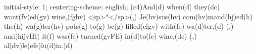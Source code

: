 initial-style: 1;
centering-scheme: english;
(c4)And(d) when(d) they(dc) want(fv)ed(gv) wine,(fghv) <sp>*</sp>(,) Je(hv)sus(hv) com(hv)mand(hj)ed(h) the(h) wa(g)ter(hv) pots(g) to(g) be(g) filled(efgv) with(fe) wa(d)ter,(d) (,) and(hijvIH) it(f) was(fe) turned(gvFE) in(d)to(fe) wine,(dc) (,) al(dv)le(efe)lu(d)ia.(d)
